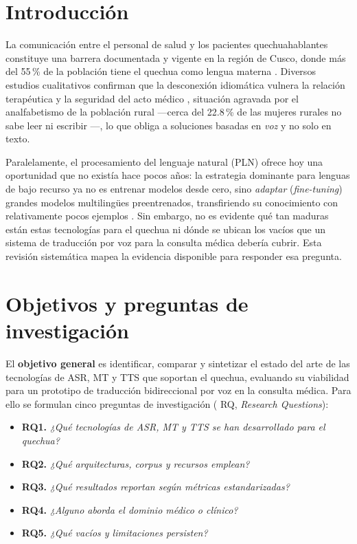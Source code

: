 \documentclass[10pt,twocolumn,a4paper]{article}
\begin{document}
\section{Introducci\'on}
La comunicaci\'on entre el personal de salud y los pacientes quechuahablantes constituye una barrera documentada y vigente en la regi\'on de Cusco, donde m\'as del 55\,\% de la poblaci\'on tiene el quechua como lengua materna \parencite{essalud2023}. Diversos estudios cualitativos confirman que la desconexi\'on idiom\'atica vulnera la relaci\'on terap\'eutica y la seguridad del acto m\'edico \parencite{begazo2026,cuaila2022}, situaci\'on agravada por el analfabetismo de la poblaci\'on rural ---cerca del 22.8\,\% de las mujeres rurales no sabe leer ni escribir \parencite{inei2023,dispurse2023}---, lo que obliga a soluciones basadas en \emph{voz} y no solo en texto.

Paralelamente, el procesamiento del lenguaje natural (PLN) ofrece hoy una oportunidad que no exist\'ia hace pocos a\~nos: la estrategia dominante para lenguas de bajo recurso ya no es entrenar modelos desde cero, sino \emph{adaptar} (\emph{fine-tuning}) grandes modelos multiling\"ues preentrenados, transfiriendo su conocimiento con relativamente pocos ejemplos \parencite{pratap2024mms,costajussa2022nllb}. Sin embargo, no es evidente qu\'e tan maduras est\'an estas tecnolog\'ias para el quechua ni d\'onde se ubican los vac\'ios que un sistema de traducci\'on por voz para la consulta m\'edica deber\'ia cubrir. Esta revisi\'on sistem\'atica mapea la evidencia disponible para responder esa pregunta.

\section{Objetivos y preguntas de investigaci\'on}
El \textbf{objetivo general} es identificar, comparar y sintetizar el estado del arte de las tecnolog\'ias de ASR, MT y TTS que soportan el quechua, evaluando su viabilidad para un prototipo de traducci\'on bidireccional por voz en la consulta m\'edica. Para ello se formulan cinco preguntas de investigaci\'on ( RQ, \emph{Research Questions}):
\begin{itemize}[label=\textcolor{cTeal}{\footnotesize$\blacktriangleright$}]
  \item \textbf{RQ1.} \textit{¿Qu\'e tecnolog\'ias de ASR, MT y TTS se han desarrollado para el quechua?}
  \item \textbf{RQ2.} \textit{¿Qu\'e arquitecturas, corpus y recursos emplean?}
  \item \textbf{RQ3.} \textit{¿Qu\'e resultados reportan seg\'un m\'etricas estandarizadas?}
  \item \textbf{RQ4.} \textit{¿Alguno aborda el dominio m\'edico o cl\'inico?}
  \item \textbf{RQ5.} \textit{¿Qu\'e vac\'ios y limitaciones persisten?}
\end{itemize}
\end{document}
